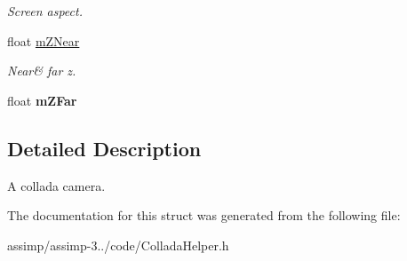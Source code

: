 \begin{DoxyCompactItemize}
\begin{DoxyCompactList}\small\item\em Screen aspect. \end{DoxyCompactList}\item 
\hypertarget{struct_assimp_1_1_collada_1_1_camera_a4935bc4d0c5fe8be562719c80fd240ab}{float \hyperlink{struct_assimp_1_1_collada_1_1_camera_a4935bc4d0c5fe8be562719c80fd240ab}{m\+Z\+Near}}\label{struct_assimp_1_1_collada_1_1_camera_a4935bc4d0c5fe8be562719c80fd240ab}

\begin{DoxyCompactList}\small\item\em Near\& far z. \end{DoxyCompactList}\item 
\hypertarget{struct_assimp_1_1_collada_1_1_camera_a29efb0beb7f96c992da7c9f0d7f971a2}{float {\bfseries m\+Z\+Far}}\label{struct_assimp_1_1_collada_1_1_camera_a29efb0beb7f96c992da7c9f0d7f971a2}

\end{DoxyCompactItemize}


\subsection{Detailed Description}
A collada camera. 

The documentation for this struct was generated from the following file\+:\begin{DoxyCompactItemize}
\item 
assimp/assimp-\/3../code/Collada\+Helper.\+h\end{DoxyCompactItemize}
